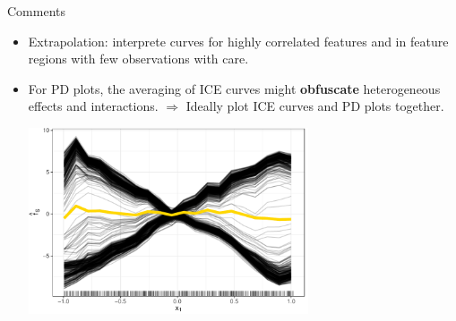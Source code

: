 \documentclass[11pt,compress,t,notes=noshow, aspectratio=169, xcolor=table]{beamer}
\begin{document}
\begin{frame}{Comments}
\begin{itemize}
\item Extrapolation: interprete curves for highly correlated features and in feature regions with few observations with care.

\item For PD plots, the averaging of ICE curves might \textbf{obfuscate} heterogeneous effects and interactions. \newline \(\Rightarrow\) Ideally plot ICE curves and PD plots together.

\begin{center}\includegraphics[width=0.65\textwidth]{figure/pdp_xor.pdf} \end{center}
\end{itemize}

\end{frame}


\endlecture
\end{document}
